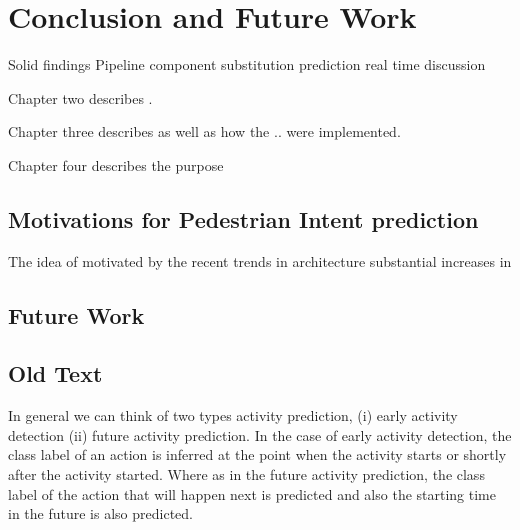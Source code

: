 
\chapter{Conclusion and Future Work}

Solid findings
Pipeline
component substitution
prediction
real time discussion

Chapter two describes .

Chapter three describes as well as how the ..  were implemented.

Chapter four describes the purpose 

\section{Motivations for Pedestrian Intent prediction}

The idea of  motivated by the recent trends in 
architecture 
substantial increases in 


\section{Future Work}

\section{Old Text}
In general we can think of two types activity prediction, (i) early activity detection (ii) future activity prediction. In the case of early activity detection, the class label of an action is inferred at the point when the activity starts or shortly after the activity started. Where as in the future activity prediction, the class label of the action that will happen next is predicted and also the starting time in the future is also predicted.




